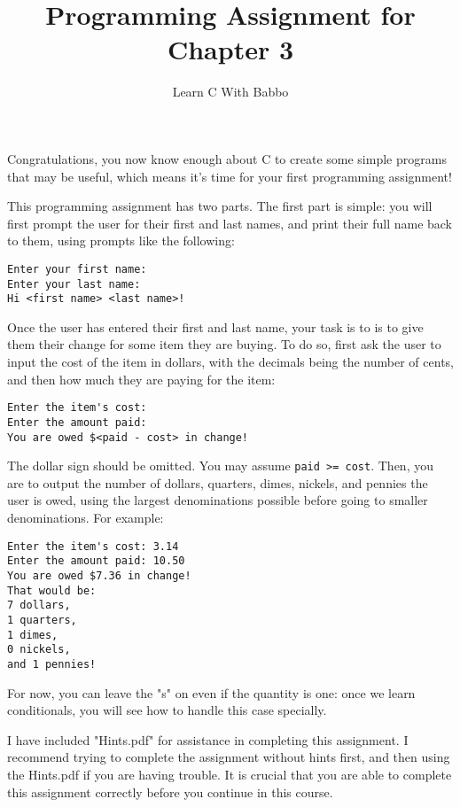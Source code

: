 \documentclass{article}
\begin{document}
\title{Programming Assignment for Chapter 3}
\author{Learn C With Babbo}
\date{}
\maketitle
Congratulations, you now know enough about C to create some simple programs that may be useful, which means it's time 
for your first programming assignment! 

This programming assignment has two parts. The first part is simple: you will first prompt the user for their
first and last names, and print their full name back to them, using prompts like the following:
\begin{verbatim}
Enter your first name: 
Enter your last name:
Hi <first name> <last name>!
\end{verbatim}

Once the user has entered their first and last name, your task is to is to give them their change for some item they
are buying. To do so, first ask the user to input the cost of the item in dollars, with the decimals being the number
of cents, and then how much they are paying for the item:
\begin{verbatim}
Enter the item's cost: 
Enter the amount paid:
You are owed $<paid - cost> in change!
\end{verbatim}
The dollar sign should be omitted. You may assume \verb|paid >= cost|. Then, you are to output the number of dollars, 
quarters, dimes, nickels, and pennies the user is owed, using the largest denominations possible before going to smaller
denominations. For example:
\begin{verbatim}
Enter the item's cost: 3.14
Enter the amount paid: 10.50
You are owed $7.36 in change!
That would be:
7 dollars,
1 quarters,
1 dimes,
0 nickels,
and 1 pennies!
\end{verbatim}
For now, you can leave the "s" on even if the quantity is one: once we learn conditionals, you will see how to
handle this case specially.

I have included "Hints.pdf" for assistance in completing this assignment. I recommend trying to complete the assignment
without hints first, and then using the Hints.pdf if you are having trouble. It is crucial that you are able to complete
this assignment correctly before you continue in this course.
\end{document}
